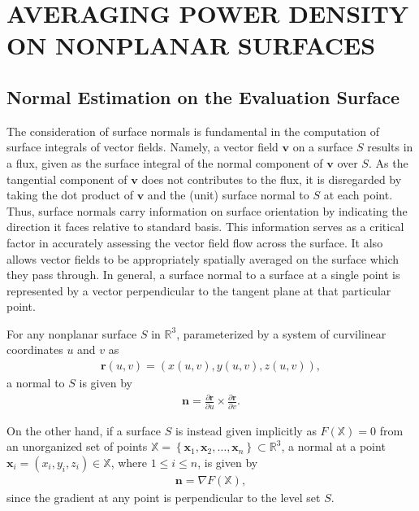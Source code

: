 \cleardoublepage

\chapter{AVERAGING POWER DENSITY ON NONPLANAR SURFACES}
\label{chap:4}

\section{Normal Estimation on the Evaluation Surface}
\label{sec:normal_estimation_on_the_evaluation_surface}
The consideration of surface normals is fundamental in the computation of surface integrals of vector fields.
Namely, a vector field $\mathbf{v}$ on a surface $S$ results in a flux, given as the surface integral of the normal component of $\mathbf{v}$ over $S$.
As the tangential component of $\mathbf{v}$ does not contributes to the flux, it is disregarded by taking the dot product of $\mathbf{v}$ and the (unit) surface normal to $S$ at each point.
Thus, surface normals carry information on surface orientation by indicating the direction it faces relative to standard basis.
This information serves as a critical factor in accurately assessing the vector field flow across the surface.
It also allows vector fields to be appropriately spatially averaged on the surface which they pass through.
In general, a surface normal to a surface at a single point is represented by a vector perpendicular to the tangent plane at that particular point.

For any nonplanar surface $S$ in $\mathbb{R}^3$, parameterized by a system of curvilinear coordinates $u$ and $v$ as
\begin{align}
    \mathbf{r}(u, v) = \left( x(u, v), y(u, v), z(u, v) \right),
\end{align}
a normal to $S$ is given by 
\begin{align}
    \mathbf{n} = \frac{\partial \mathbf{r}}{\partial u} \times \frac{\partial \mathbf{r}}{\partial v}.
\end{align}

On the other hand, if a surface $S$ is instead given implicitly as $F(\mathbb{X}) = 0$ from an unorganized set of points $\mathbb{X} = \left\{ \mathbf{x}_1, \mathbf{x}_2, \dots, \mathbf{x}_n \right\} \subset \mathbb{R}^3$, a normal at a point $\mathbf{x}_i = (x_i, y_i, z_i) \in \mathbb{X}$, where $1 \leq i \leq n$, is given by
\begin{align}
    \mathbf{n} = \nabla F(\mathbb{X}),
\end{align}
since the gradient at any point is perpendicular to the level set $S$.

